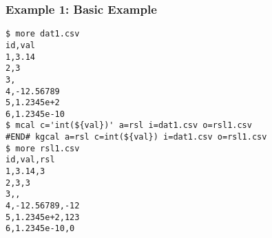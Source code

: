\subsubsection*{Example 1: Basic Example}



\begin{Verbatim}[baselinestretch=0.7,frame=single]
$ more dat1.csv
id,val
1,3.14
2,3
3,
4,-12.56789
5,1.2345e+2
6,1.2345e-10
$ mcal c='int(${val})' a=rsl i=dat1.csv o=rsl1.csv
#END# kgcal a=rsl c=int(${val}) i=dat1.csv o=rsl1.csv
$ more rsl1.csv
id,val,rsl
1,3.14,3
2,3,3
3,,
4,-12.56789,-12
5,1.2345e+2,123
6,1.2345e-10,0
\end{Verbatim}
